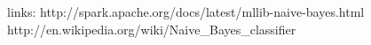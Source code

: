 links:
http://spark.apache.org/docs/latest/mllib-naive-bayes.html
http://en.wikipedia.org/wiki/Naive_Bayes_classifier



